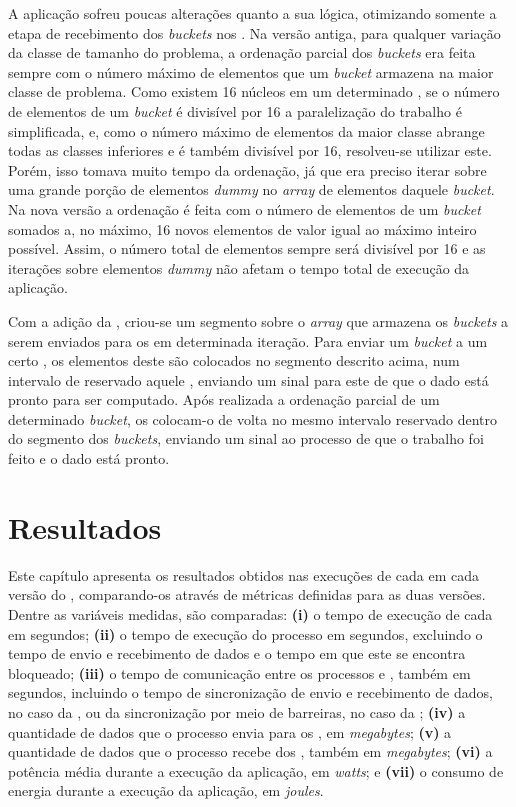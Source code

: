A aplicação \textit{\IS} sofreu poucas alterações quanto a sua lógica, otimizando somente a etapa de recebimento dos \textit{buckets} nos \slaves. Na versão antiga, para qualquer variação da classe de tamanho do problema, a ordenação parcial dos \textit{buckets} era feita sempre com o número máximo de elementos que um \textit{bucket} armazena na maior classe de problema. Como existem 16 núcleos em um determinado \cluster, se o número de elementos de um \textit{bucket} é divisível por 16 a paralelização do trabalho é simplificada, e, como o número máximo de elementos da maior classe abrange todas as classes inferiores e é também divisível por 16, resolveu-se utilizar este. Porém, isso tomava muito tempo da ordenação, já que era preciso iterar sobre uma grande porção de elementos \textit{dummy} no \textit{array} de elementos daquele \textit{bucket}. Na nova versão a ordenação é feita com o número de elementos de um \textit{bucket} somados a, no máximo, 16 novos elementos de valor igual ao máximo inteiro possível. Assim, o número total de elementos sempre será divisível por 16 e as iterações sobre elementos \textit{dummy} não afetam o tempo total de execução da aplicação.

Com a adição da \API \ASYNC, criou-se um segmento sobre o \textit{array} que armazena os \textit{buckets} a serem enviados para os \CCs em determinada iteração. Para enviar um \textit{bucket} a um certo \CC, os elementos deste são colocados no segmento descrito acima, num intervalo de \offsets reservado aquele \CC, enviando um sinal para este \slave de que o dado está pronto para ser computado. Após realizada a ordenação parcial de um determinado \textit{bucket}, os \CCs colocam-o de volta no mesmo intervalo reservado dentro do segmento dos \textit{buckets}, enviando um sinal ao processo \master de que o trabalho foi feito e o dado está pronto.
 
\chapter{Resultados}
\label{ch:resultados}

Este capítulo apresenta os resultados obtidos nas execuções de cada  em cada versão do \capb, comparando-os através de métricas definidas para as duas versões. Dentre as variáveis medidas, são comparadas: \textbf{(i)} o tempo de execução de cada \CC em segundos; \textbf{(ii)} o tempo de execução do processo \master em segundos, excluindo o tempo de envio e recebimento de dados e o tempo em que este se encontra bloqueado; \textbf{(iii)} o tempo de comunicação entre os processos \master e \slave, também em segundos, incluindo o tempo de sincronização de envio e recebimento de dados, no caso da \IPC, ou da sincronização por meio de barreiras, no caso da \ASYNC; \textbf{(iv)} a quantidade de dados que o processo \master envia para os \slaves, em \textit{megabytes}; \textbf{(v)} a quantidade de dados que o processo \master recebe dos \slaves, também em \textit{megabytes}; \textbf{(vi)} a potência média durante a execução da aplicação, em \textit{watts}; e \textbf{(vii)} o consumo de energia durante a execução da aplicação, em \textit{joules}.

